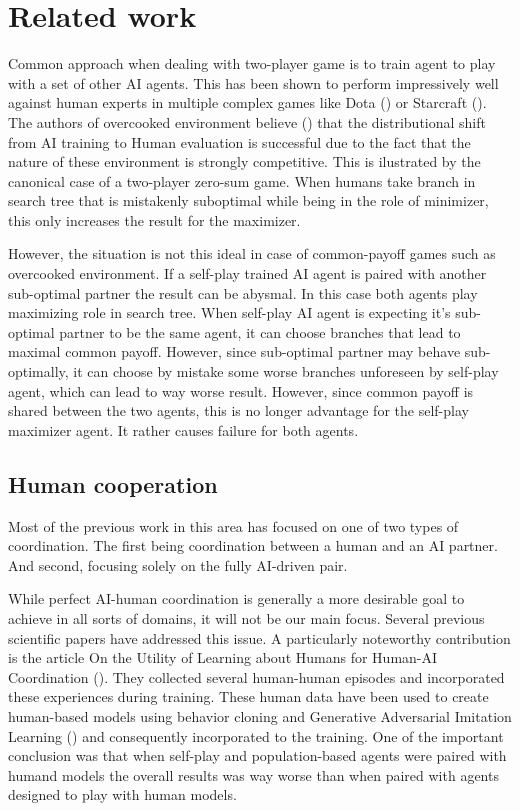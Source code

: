 \chapter{Related work}

Common approach when dealing with two-player game is to train agent to play with a set of other AI agents.
This has been shown to perform impressively well against human experts in multiple complex games like Dota (\cite{DotaOpenFive}) or Starcraft (\cite{Starcraft}).
The authors of overcooked environment believe (\cite{carroll2020utility}) that the distributional shift from AI training to Human evaluation is successful due to the fact that the nature of these environment is strongly competitive.
This is ilustrated by the canonical case of a two-player zero-sum game.
When humans take branch in search tree that is mistakenly suboptimal while being in the role of minimizer, this only increases the result for the maximizer.

However, the situation is not this ideal in case of common-payoff games such as overcooked environment.
If a self-play trained AI agent is paired with another sub-optimal partner the result can be abysmal. 
In this case both agents play maximizing role in search tree. 
When self-play AI agent is expecting it's sub-optimal partner to be the same agent, it can choose branches that lead to maximal common payoff.
However, since sub-optimal partner may behave sub-optimally, it can choose by mistake some worse branches unforeseen by self-play agent, which can lead to way worse result.
However, since common payoff is shared between the two agents, this is no longer advantage for the self-play maximizer agent.
It rather causes failure for both agents.

\section{Human cooperation}
Most of the previous work in this area has focused on one of two types of coordination. 
The first being coordination between a human and an AI partner. 
And second, focusing solely on the fully AI-driven pair.


\par

While perfect AI-human coordination is generally a more desirable goal to achieve in all sorts of domains, it will not be our main focus.  
Several previous scientific papers have addressed this issue. A particularly noteworthy contribution is the article 
On the Utility of Learning about Humans for Human-AI Coordination (\cite{carroll2020utility}). 
They collected several human-human episodes and incorporated these experiences during training.
These human data have been used to create human-based models using behavior cloning and Generative Adversarial Imitation Learning (\cite{Ho2016GenerativeAI}) and consequently incorporated to the training.
One of the important conclusion was that when self-play and population-based agents were paired with humand models the overall results was way worse than when paired with agents designed to play with human models.


